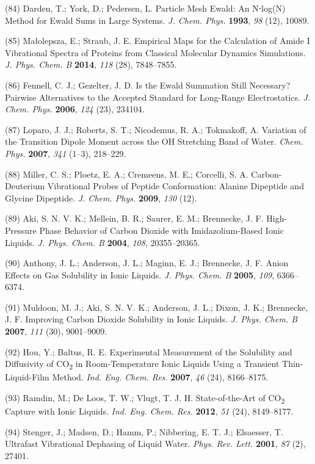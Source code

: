 \documentclass[]{article}
\begin{document}
(84) Darden, T.; York, D.; Pedersen, L. Particle Mesh Ewald: An N⋅log(N)
Method for Ewald Sums in Large Systems. \emph{J. Chem. Phys.}
\textbf{1993}, \emph{98} (12), 10089.

(85) Małolepsza, E.; Straub, J. E. Empirical Maps for the Calculation of
Amide I Vibrational Spectra of Proteins from Classical Molecular
Dynamics Simulations. \emph{J. Phys. Chem. B} \textbf{2014}, \emph{118}
(28), 7848--7855.

(86) Fennell, C. J.; Gezelter, J. D. Is the Ewald Summation Still
Necessary? Pairwise Alternatives to the Accepted Standard for Long-Range
Electrostatics. \emph{J. Chem. Phys.} \textbf{2006}, \emph{124} (23),
234104.

(87) Loparo, J. J.; Roberts, S. T.; Nicodemus, R. A.; Tokmakoff, A.
Variation of the Transition Dipole Moment across the OH Stretching Band
of Water. \emph{Chem. Phys.} \textbf{2007}, \emph{341} (1--3), 218--229.

(88) Miller, C. S.; Ploetz, E. A.; Cremeens, M. E.; Corcelli, S. A.
Carbon-Deuterium Vibrational Probes of Peptide Conformation: Alanine
Dipeptide and Glycine Dipeptide. \emph{J. Chem. Phys.} \textbf{2009},
\emph{130} (12).

(89) Aki, S. N. V. K.; Mellein, B. R.; Saurer, E. M.; Brennecke, J. F.
High-Pressure Phase Behavior of Carbon Dioxide with Imidazolium-Based
Ionic Liquids. \emph{J. Phys. Chem. B} \textbf{2004}, \emph{108},
20355--20365.

(90) Anthony, J. L.; Anderson, J. L.; Maginn, E. J.; Brennecke, J. F.
Anion Effects on Gas Solubility in Ionic Liquids. \emph{J. Phys. Chem.
B} \textbf{2005}, \emph{109}, 6366--6374.

(91) Muldoon, M. J.; Aki, S. N. V. K.; Anderson, J. L.; Dixon, J. K.;
Brennecke, J. F. Improving Carbon Dioxide Solubility in Ionic Liquids.
\emph{J. Phys. Chem. B} \textbf{2007}, \emph{111} (30), 9001--9009.

(92) Hou, Y.; Baltus, R. E. Experimental Measurement of the Solubility
and Diffusivity of CO\textsubscript{2} in Room-Temperature Ionic Liquids
Using a Transient Thin-Liquid-Film Method. \emph{Ind. Eng. Chem. Res.}
\textbf{2007}, \emph{46} (24), 8166--8175.

(93) Ramdin, M.; De Loos, T. W.; Vlugt, T. J. H. State-of-the-Art of
CO\textsubscript{2} Capture with Ionic Liquids. \emph{Ind. Eng. Chem.
Res.} \textbf{2012}, \emph{51} (24), 8149--8177.

(94) Stenger, J.; Madsen, D.; Hamm, P.; Nibbering, E. T. J.; Elsaesser,
T. Ultrafast Vibrational Dephasing of Liquid Water. \emph{Phys. Rev.
Lett.} \textbf{2001}, \emph{87} (2), 27401.
\end{document}
